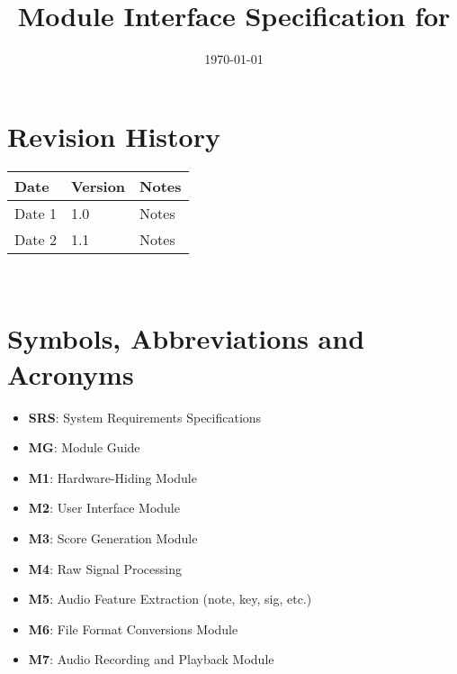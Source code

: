 \documentclass[12pt, titlepage]{article}
\begin{document}
\title{Module Interface Specification for \progname{}}

\author{\authname}

\date{\today}

\maketitle


\section{Revision History}

\begin{tabularx}{\textwidth}{p{3cm}p{2cm}X}
\toprule {\bf Date} & {\bf Version} & {\bf Notes}\\
\midrule
Date 1 & 1.0 & Notes\\
Date 2 & 1.1 & Notes\\
\bottomrule
\end{tabularx}

~\newpage

\section{Symbols, Abbreviations and Acronyms}

\begin{itemize}
    \item \textbf{SRS}: System Requirements Specifications
    \item \textbf{MG}: Module Guide
    \item \textbf{M1}: Hardware-Hiding Module
    \item \textbf{M2}: User Interface Module
    \item \textbf{M3}: Score Generation Module
    \item \textbf{M4}: Raw Signal Processing
    \item \textbf{M5}: Audio Feature Extraction (note, key, sig, etc.)
    \item \textbf{M6}: File Format Conversions Module
    \item \textbf{M7}: Audio Recording and Playback Module
\end{itemize}

\newpage

\tableofcontents

\newpage

\end{document}
